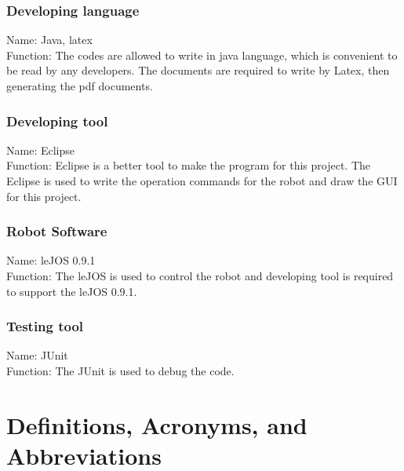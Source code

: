 \documentclass[11pt, a4paper]{report}
\begin{document}
\subsection{Developing language}
Name: Java, latex\\
Function: The codes are allowed to write in java language, which is convenient to be read by any developers. The documents are required to write by Latex, then generating the pdf documents.
\subsection{Developing tool}
Name: Eclipse\\
Function: Eclipse is a better tool to make the program for this project. The Eclipse is used to write the operation commands for the robot and draw the GUI for this project.
\subsection{Robot Software}
Name: leJOS 0.9.1\\
 Function: The leJOS is used to control the robot and developing tool is required to support the leJOS 0.9.1.
 \subsection{Testing tool}
 Name: JUnit\\
 Function: The JUnit is used to debug the code.

\pagebreak

\chapter{Definitions, Acronyms, and Abbreviations} %
\label{cha:DAA}
\end{document}
